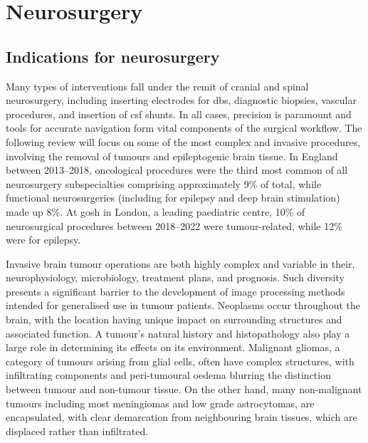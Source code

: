 
\section{Neurosurgery}\label{sec:neurosurgery}

\subsection{Indications for neurosurgery}


Many types of interventions fall under the remit of cranial and spinal neurosurgery, including inserting electrodes for \gls{dbs}, diagnostic biopsies, vascular procedures, and insertion of \gls{csf} shunts.
In all cases, precision is paramount and tools for accurate navigation form vital components of the surgical workflow.
The following review will focus on some of the most complex and invasive procedures, involving the removal of tumours and epileptogenic brain tissue.
In England between 2013--2018, oncological procedures were the third most common of all neurosurgery subspecialties comprising approximately 9\% of total, while functional neurosurgeries (including for epilepsy and deep brain stimulation) made up 8\%\autocite{Wahba2022}.
At \gls{gosh} in London, a leading paediatric centre, 10\% of neurosurgical procedures between 2018--2022 were tumour-related, while 12\% were for epilepsy\autocite{gosh2023}.

Invasive brain tumour operations are both highly complex and variable in their, neurophysiology, microbiology, treatment plans, and prognosis.
Such diversity presents a significant barrier to the development of image processing methods intended for generalised use in tumour patients\autocite{Bauer2013}.
Neoplasms occur throughout the brain, with the location having unique impact on surrounding structures and associated function.
A tumour's natural history and histopathology also play a large role in determining its effects on its environment.
Malignant gliomas, a category of tumours arising from glial cells, often have complex structures, with infiltrating components and peri-tumoural oedema blurring the distinction between tumour and non-tumour tissue\autocite{Weller2021}.
On the other hand, many non-malignant tumours including most meningiomas and low grade astrocytomas, are encapsulated, with clear demarcation from neighbouring brain tissues, which are displaced rather than infiltrated\autocite{Lu2004,Gerard2017}.

